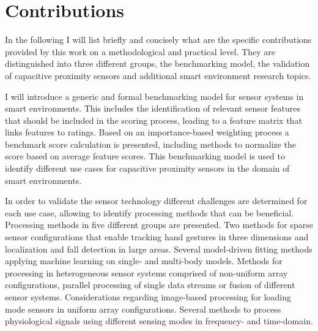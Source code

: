  
\section{Contributions}
In the following I will list briefly and concisely what are the specific contributions provided by this work on a methodological and practical level. They are distinguished into three different groups, the benchmarking model, the validation of capacitive proximity sensors and additional smart environment research topics.

I will introduce a generic and formal benchmarking model for sensor systems in smart environments. This includes the identification of relevant sensor features that should be included in the scoring process, leading to a feature matrix that links features to ratings. Based on an importance-based weighting process a benchmark score calculation is presented, including methods to normalize the score based on average feature scores. This benchmarking model is used to identify different use cases for capacitive proximity sensors in the domain of smart environments.

In order to validate the sensor technology different challenges are determined for each use case, allowing to identify processing methods that can be beneficial. Processing methods in five different groups are presented. Two methods for sparse sensor configurations that enable tracking hand gestures in three dimensions and localization and fall detection in large areas. Several model-driven fitting methods applying machine learning on single- and multi-body models. Methods for processing in heterogeneous sensor systems comprised of non-uniform array configurations, parallel processing of single data streams or fusion of different sensor systems. Considerations regarding image-based processing for loading mode sensors in uniform array configurations. Several methods to process physiological signals using different sensing modes in frequency- and time-domain. 


